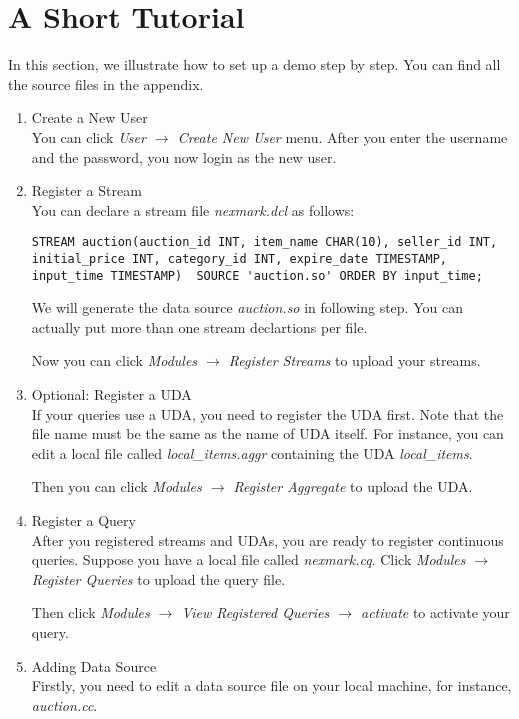 \documentclass[10pt]{article}
\begin{document}
\section{A Short Tutorial}
\label{sec:tutorial}
In this section, we illustrate how to set up a demo step by step.  You can find all the source files in the appendix.

\begin{enumerate}
\item Create a New User\\
You can click {\em User $\rightarrow$ Create New User} menu.  After you enter the username and the password, you now login as the new user.


\item Register a Stream\\
You can declare a stream file {\em nexmark.dcl} as follows:

\begin{verbatim}
STREAM auction(auction_id INT, item_name CHAR(10), seller_id INT, 
initial_price INT, category_id INT, expire_date TIMESTAMP, 
input_time TIMESTAMP)  SOURCE 'auction.so' ORDER BY input_time;
\end{verbatim}
We will generate the data source {\em auction.so} in following step.  You can actually put more than one stream declartions per file.  

Now you can click {\em Modules $\rightarrow$ Register Streams} to upload your streams.
\item Optional: Register a UDA\\
If your queries use a UDA, you need to register the UDA first.  Note that the file name must be the same as the name of UDA itself.  For instance, you can edit a local file called {\em local\_items.aggr} containing the UDA {\em local\_items}.  

Then you can click {\em Modules $\rightarrow$ Register Aggregate} to upload the UDA.

\item Register a Query\\
After you registered streams and UDAs, you are ready to register continuous queries.  Suppose you have a local file called {\em nexmark.cq}.  Click {\em Modules $\rightarrow$ Register Queries} to upload the query file.

Then click {\em Modules $\rightarrow$ View Registered Queries $\rightarrow$ activate} to activate your query.

\item Adding Data Source\\
Firstly, you need to edit a data source file on your local machine, for instance, {\em auction.cc}.


\end{enumerate}
\end{document}
